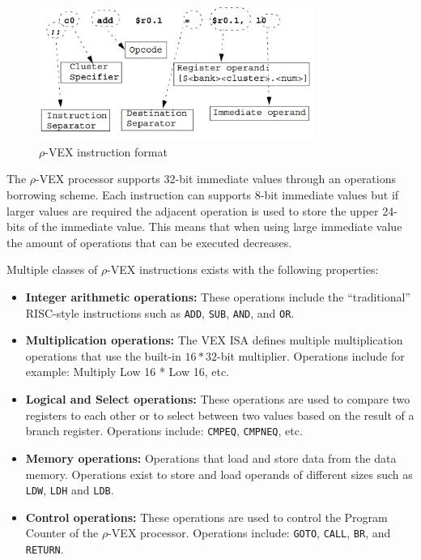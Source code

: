 \begin{figure}[ht!]
\centering
\includegraphics[width=0.8\textwidth]{2_background/img/Instructions.png}
\caption{$\rho$-VEX instruction format}
\label{fig:rvex_asm}
\end{figure}

The $\rho$-VEX processor supports 32-bit immediate values through an operations borrowing scheme. Each instruction can supports 8-bit immediate values but if larger values are required the adjacent operation is used to store the upper 24-bits of the immediate value. This means that when using large immediate value the amount of operations that can be executed decreases.

Multiple classes of $\rho$-VEX instructions exists with the following properties:

\begin{itemize}
  \item \textbf{Integer arithmetic operations:} These operations include the “traditional” RISC-style instructions such as \texttt{ADD}, \texttt{SUB}, \texttt{AND}, and \texttt{OR}. 
  \item \textbf{Multiplication operations:} The VEX ISA defines multiple multiplication operations that use the built-in $16*32$-bit multiplier. Operations include for example: Multiply Low 16 * Low 16, etc. 
  \item \textbf{Logical and Select operations:} These operations are used to compare two registers to each other or to select between two values based on the result of a branch register. Operations include: \texttt{CMPEQ}, \texttt{CMPNEQ}, etc.
  \item \textbf{Memory operations:} Operations that load and store data from the data memory. Operations exist to store and load operands of different sizes such as \texttt{LDW}, \texttt{LDH} and \texttt{LDB}.
  \item \textbf{Control operations:} These operations are used to control the Program Counter of the $\rho$-VEX processor. Operations include: \texttt{GOTO}, \texttt{CALL}, \texttt{BR}, and \texttt{RETURN}.
\end{itemize}


